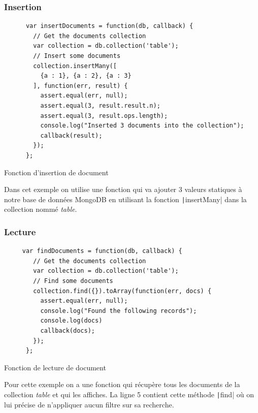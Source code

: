 \documentclass[a4paper]{scrreprt}
\begin{document}
\subsubsection{Insertion}
\begin{listing}[H]
	\begin{verbatim}	
      var insertDocuments = function(db, callback) {
        // Get the documents collection
        var collection = db.collection('table');
        // Insert some documents
        collection.insertMany([
          {a : 1}, {a : 2}, {a : 3}
        ], function(err, result) {
          assert.equal(err, null);
          assert.equal(3, result.result.n);
          assert.equal(3, result.ops.length);
          console.log("Inserted 3 documents into the collection");
          callback(result);
        });
      };
	\end{verbatim}
	\caption{Fonction d'insertion de document}
	\label{lst:insert_mongoDB}
\end{listing}
Dans cet exemple on utilise une fonction qui va ajouter 3 valeurs statiques à notre base de données MongoDB en utilisant la fonction \texttt|insertMany| dans la collection nommé \textit{table}.
\subsubsection{Lecture}
\begin{listing}[H]
	\begin{verbatim}	
     var findDocuments = function(db, callback) {
        // Get the documents collection
        var collection = db.collection('table');
        // Find some documents
        collection.find({}).toArray(function(err, docs) {
          assert.equal(err, null);
          console.log("Found the following records");
          console.log(docs)
          callback(docs);
        });
      };
	\end{verbatim}
	\caption{Fonction de lecture de document}
	\label{lst:read_mongoDB}
\end{listing}
Pour cette exemple on a une fonction qui récupère tous les documents de la collection \textit{table} et qui les affiches. La ligne 5 contient cette méthode \texttt|find| où on lui précise de n'appliquer aucun filtre sur sa recherche.
\end{document}
